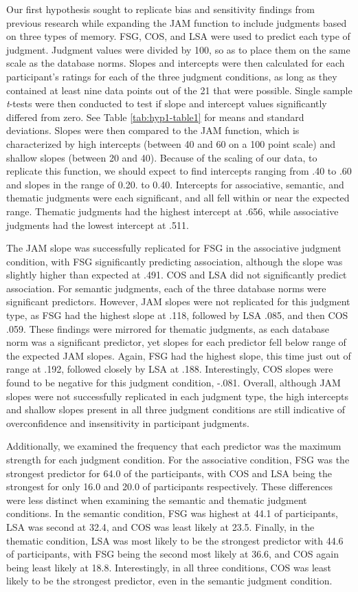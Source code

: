 \documentclass[english,man]{apa6}
\theoremstyle{definition}
\theoremstyle{definition}
\theoremstyle{definition}
\theoremstyle{remark}
\begin{document}
Our first hypothesis sought to replicate bias and sensitivity findings
from previous research while expanding the JAM function to include
judgments based on three types of memory. FSG, COS, and LSA were used to
predict each type of judgment. Judgment values were divided by 100, so
as to place them on the same scale as the database norms. Slopes and
intercepts were then calculated for each participant's ratings for each
of the three judgment conditions, as long as they contained at least
nine data points out of the 21 that were possible. Single sample
\emph{t}-tests were then conducted to test if slope and intercept values
significantly differed from zero. See Table \ref{tab:hyp1-table1} for
means and standard deviations. Slopes were then compared to the JAM
function, which is characterized by high intercepts (between 40 and 60
on a 100 point scale) and shallow slopes (between 20 and 40). Because of
the scaling of our data, to replicate this function, we should expect to
find intercepts ranging from .40 to .60 and slopes in the range of 0.20.
to 0.40. Intercepts for associative, semantic, and thematic judgments
were each significant, and all fell within or near the expected range.
Thematic judgments had the highest intercept at .656, while associative
judgments had the lowest intercept at .511.

The JAM slope was successfully replicated for FSG in the associative
judgment condition, with FSG significantly predicting association,
although the slope was slightly higher than expected at .491. COS and
LSA did not significantly predict association. For semantic judgments,
each of the three database norms were significant predictors. However,
JAM slopes were not replicated for this judgment type, as FSG had the
highest slope at .118, followed by LSA .085, and then COS .059. These
findings were mirrored for thematic judgments, as each database norm was
a significant predictor, yet slopes for each predictor fell below range
of the expected JAM slopes. Again, FSG had the highest slope, this time
just out of range at .192, followed closely by LSA at .188.
Interestingly, COS slopes were found to be negative for this judgment
condition, -.081. Overall, although JAM slopes were not successfully
replicated in each judgment type, the high intercepts and shallow slopes
present in all three judgment conditions are still indicative of
overconfidence and insensitivity in participant judgments.

Additionally, we examined the frequency that each predictor was the
maximum strength for each judgment condition. For the associative
condition, FSG was the strongest predictor for 64.0 of the participants,
with COS and LSA being the strongest for only 16.0 and 20.0 of
participants respectively. These differences were less distinct when
examining the semantic and thematic judgment conditions. In the semantic
condition, FSG was highest at 44.1 of participants, LSA was second at
32.4, and COS was least likely at 23.5. Finally, in the thematic
condition, LSA was most likely to be the strongest predictor with 44.6
of participants, with FSG being the second most likely at 36.6, and COS
again being least likely at 18.8. Interestingly, in all three
conditions, COS was least likely to be the strongest predictor, even in
the semantic judgment condition.
\end{document}
